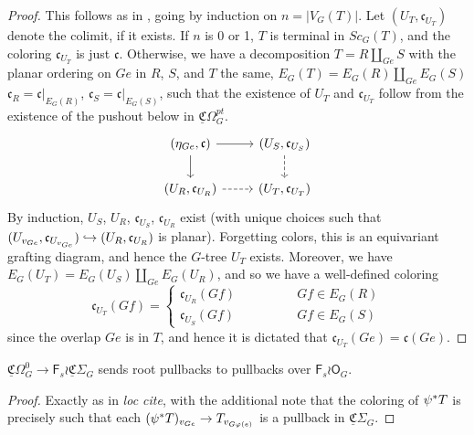 \documentclass[a4paper,10pt
]{article}%
\renewcommand{\phi}{\varphi}
\newcommand{\UC}{\underline{\mathfrak C}}
\renewcommand{\1}{\ensuremath{\mathbb{id}}}
\begin{document}
\begin{proof}
      This follows as in \cite[Prop. 3.41]{BP17}, going by induction on $n=|V_G(T)|$.
      Let $(U_T,\mathfrak c_{U_T})$ denote the colimit, if it exists.
      If $n$ is 0 or 1, $T$ is terminal in $Sc_G(T)$, and the coloring $\mathfrak c_{U_T}$ is just $\mathfrak c$.
      Otherwise, we have a decomposition $T = R \amalg_{Ge} S$ with
      the planar ordering on $Ge$ in $R$, $S$, and $T$ the same,
      $E_G(T) = E_G(R) \amalg_{Ge} E_G(S)$
      $\mathfrak c_{R} = \mathfrak c|_{E_G(R)}$,
      $\mathfrak c_{S} = \mathfrak c|_{E_G(S)}$,
      such that
      the existence of $U_T$ and $\mathfrak c_{U_T}$ follow from the existence of the pushout below in $\underline{\mathfrak C}\Omega_G^{pt}$.
      \begin{equation}
            \begin{tikzcd}
                  (\eta_{Ge}, \mathfrak c) \arrow[d] \arrow[r]
                  &
                  (U_S, \mathfrak c_{U_S}) \arrow[d, dashed]
                  \\
                  (U_R, \mathfrak c_{U_R}) \arrow[r, dashed]
                  &
                  (U_T, \mathfrak c_{U_T})
            \end{tikzcd}
      \end{equation}
      By induction, $U_S$, $U_R$, $\mathfrak c_{U_S}$, $\mathfrak c_{U_R}$ exist
      (with unique choices such that $(U_{v_{Ge}}, \mathfrak c_{U_{v_{Ge}}}) \hookrightarrow(U_R, \mathfrak c_{U_R})$ is planar).
      Forgetting colors, this is an equivariant grafting diagram, and hence the $G$-tree $U_T$ exists.
      Moreover, we have $E_G(U_T) = E_G(U_S) \amalg_{Ge} E_G(U_R)$, and so we have a well-defined coloring
      \begin{equation}
            \mathfrak c_{U_T}(Gf) =
            \begin{cases}
                  \mathfrak c_{U_R}(Gf) \qquad \qquad & Gf \in E_G(R) \\
                  \mathfrak c_{U_S}(Gf) & Gf \in E_G(S)
            \end{cases}
      \end{equation}
      since the overlap $Ge$ is in $T$, and hence it is dictated that $\mathfrak c_{U_T}(Ge) = \mathfrak c (Ge)$.
\end{proof}

\begin{lemma}[{cf. \cite[Lemma 3.63]{BP17}}]
      $\underline{\mathfrak C}\Omega_G^0 \to \mathsf F_s \wr \underline{\mathfrak C}\Sigma_G$
      sends root pullbacks to pullbacks over $\mathsf F_s \wr \mathsf O_G$.
\end{lemma}
\begin{proof}
      Exactly as in \textit{loc cite}, with the additional note that
      the coloring of $\psi^{\**}T$ is precisely such that each $(\psi^{\**}T)_{v_{Ge}} \to T_{v_{G\phi(e)}}$
      is a pullback in $\UC \Sigma_G$.
\end{proof}
\end{document}
